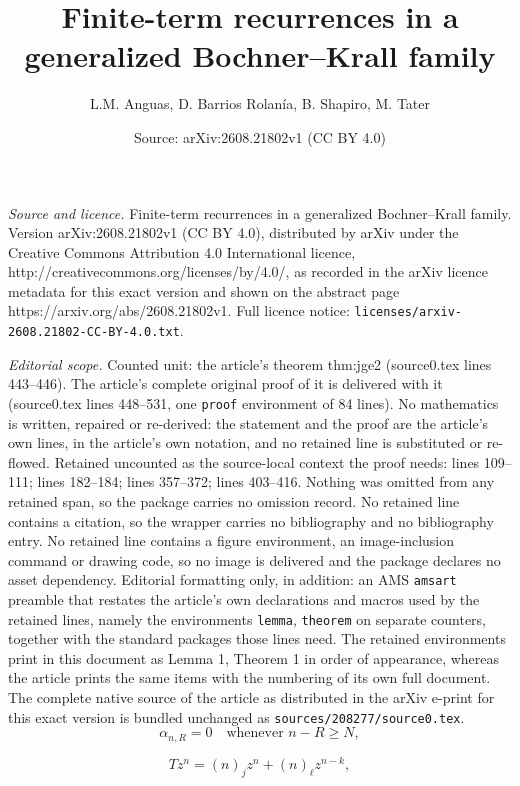 \documentclass[10pt,a4paper]{amsart}
\title{Finite-term recurrences in a generalized Bochner--Krall family}
\author{L.M. Anguas, D. Barrios Rolan\'ia, B. Shapiro, M. Tater}
\date{Source: arXiv:2608.21802v1 (CC BY 4.0)}
\newcommand{\fall}[2]{(#1)_{#2}}
\begin{document}
\maketitle

\noindent\emph{Source and licence.} Finite-term recurrences in a generalized Bochner--Krall family. Version arXiv:2608.21802v1 (CC BY 4.0), distributed by arXiv under the Creative Commons Attribution 4.0 International licence, http://creativecommons.org/licenses/by/4.0/, as recorded in the arXiv licence metadata for this exact version and shown on the abstract page https://arxiv.org/abs/2608.21802v1. Full licence notice: \texttt{licenses/arxiv-2608.21802-CC-BY-4.0.txt}.\par\smallskip

\noindent\textit{Editorial scope.} Counted unit: the article's theorem thm:jge2 (source0.tex lines 443--446). The article's complete original proof of it is delivered with it (source0.tex lines 448--531, one \texttt{proof} environment of 84 lines). No mathematics is written, repaired or re-derived: the statement and the proof are the article's own lines, in the article's own notation, and no retained line is substituted or re-flowed.  Retained uncounted as the source-local context the proof needs: lines 109--111; lines 182--184; lines 357--372; lines 403--416.  Nothing was omitted from any retained span, so the package carries no omission record.  No retained line contains a citation, so the wrapper carries no bibliography and no bibliography entry.  No retained line contains a figure environment, an image-inclusion command or drawing code, so no image is delivered and the package declares no asset dependency.  Editorial formatting only, in addition: an AMS \texttt{amsart} preamble that restates the article's own declarations and macros used by the retained lines, namely the environments \texttt{lemma}, \texttt{theorem} on separate counters, together with the standard packages those lines need.  The retained environments print in this document as Lemma 1, Theorem 1 in order of appearance, whereas the article prints the same items with the numbering of its own full document.  The complete native source of the article as distributed in the arXiv e-print for this exact version is bundled unchanged as \texttt{sources/208277/source0.tex}.
\begin{equation}\label{eq:general-rec}
\alpha_{n,R}=0\quad\text{whenever } n-R\ge N,
\end{equation}

\begin{equation}\label{eq:Tmon}
Tz^n=\fall{n}{j}z^n+\fall{n}{\ell}z^{n-k},
\end{equation}
\end{document}
